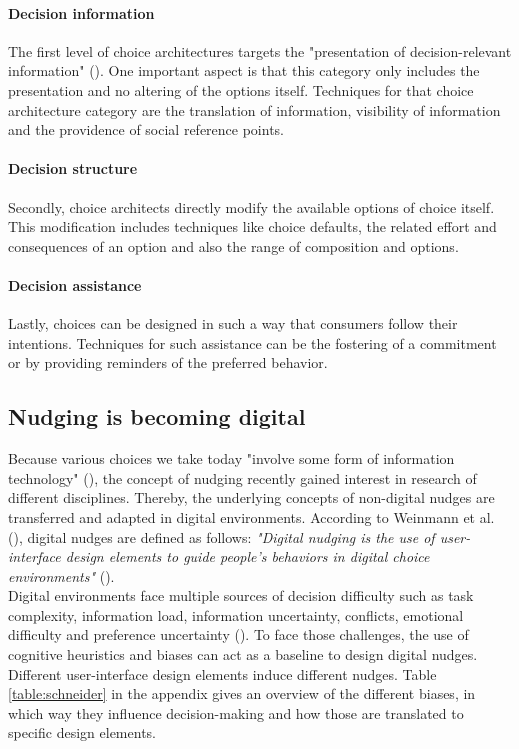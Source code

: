 \paragraph{Decision information}
The first level of choice architectures targets the "presentation of decision-relevant information" (\cite[p.514]{munscher_review_2016}). One important aspect is that this category only includes the presentation and no altering of the options itself. Techniques for that choice architecture category are the translation of information, visibility of information and the providence of social reference points.
\paragraph{Decision structure}
Secondly, choice architects directly modify the available options of choice itself. This modification includes techniques like choice defaults, the related effort and consequences of an option and also the range of composition and options.
\paragraph{Decision assistance}
Lastly, choices can be designed in such a way that consumers follow their intentions. Techniques for such assistance can be the fostering of a commitment or by providing reminders of the preferred behavior.

\subsection{Nudging is becoming digital}
Because various choices we take today "involve some form of information technology" (\cite[p.490]{johnson_beyond_2012}), the concept of nudging recently gained interest in research of different disciplines. Thereby, the underlying concepts of non-digital nudges are transferred and adapted in digital environments. According to Weinmann et al.  (\citeyear{weinmann_digital_2016}), digital nudges are defined as follows:
\textit{"Digital nudging is the use of user-interface design elements to guide people's behaviors in digital choice environments"} (\cite[p.433]{weinmann_digital_2016}).
\\

Digital environments face multiple sources of decision difficulty such as task complexity, information load, information uncertainty, conflicts, emotional difficulty and preference uncertainty (\cite{broniarczyk_decision_2014}). To face those challenges, the use of cognitive heuristics and biases can act as a baseline to design digital nudges. Different user-interface design elements induce different nudges. Table \ref{table:schneider} in the appendix gives an overview of the different biases, in which way they influence decision-making and how those are translated to specific design elements.
\\

